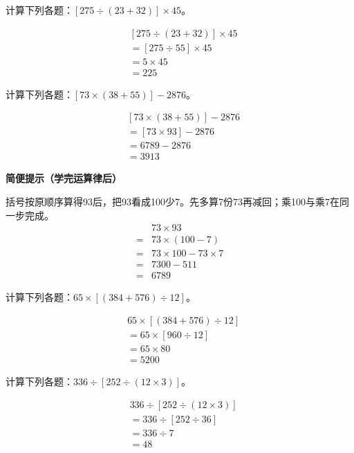 计算下列各题：\([275\div(23+32)]\times45\)。\par
\begin{BookAnswer}
\[\begin{aligned}&[275\div(23+32)]\times45\\&=[275\div55]\times45\\&=5\times45\\&=225\end{aligned}\]
\end{BookAnswer}

计算下列各题：\([73\times(38+55)]-2876\)。\par
\begin{BookAnswer}
\[\begin{aligned}&[73\times(38+55)]-2876\\&=[73\times93]-2876\\&=6789-2876\\&=3913\end{aligned}\]\par\textbf{简便提示（学完运算律后）}\par 括号按原顺序算得93后，把93看成100少7。先多算7份73再减回；乘100与乘7在同一步完成。\[\begin{aligned}&73\times93\\={}&73\times(100-7)\\={}&73\times100-73\times7\\={}&7300-511\\={}&6789\end{aligned}\]
\end{BookAnswer}

计算下列各题：\(65\times[(384+576)\div12]\)。\par
\begin{BookAnswer}
\[\begin{aligned}&65\times[(384+576)\div12]\\&=65\times[960\div12]\\&=65\times80\\&=5200\end{aligned}\]
\end{BookAnswer}

计算下列各题：\(336\div[252\div(12\times3)]\)。\par
\begin{BookAnswer}
\[\begin{aligned}&336\div[252\div(12\times3)]\\&=336\div[252\div36]\\&=336\div7\\&=48\end{aligned}\]
\end{BookAnswer}

